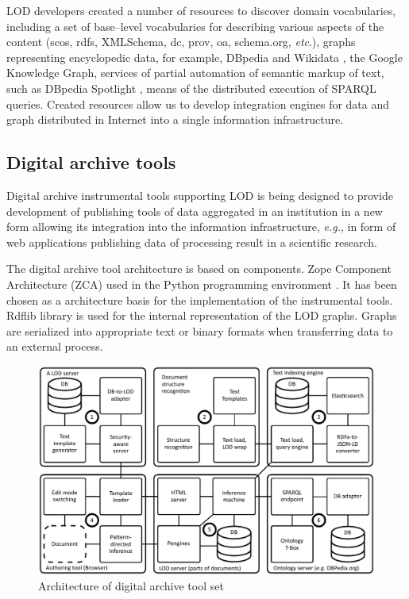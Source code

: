 \documentclass[conference,a4paper]{IEEEtran}
\begin{document}
LOD developers created a number of resources to discover domain vocabularies, including a set of base--level vocabularies for describing various aspects of the content (scos, rdfs, XMLSchema, dc, prov, oa, schema.org, \emph{etc}.), graphs representing encyclopedic data, for example, DBpedia \cite{b3} and Wikidata \cite{b4}, the Google Knowledge Graph, services of partial automation of semantic markup of text, such as DBpedia Spotlight \cite{b5}, means of the distributed execution of SPARQL queries.  Created resources allow us to develop integration engines for data and graph distributed in Internet into a single information infrastructure.

\subsection{Digital archive tools}

Digital archive instrumental tools supporting LOD is being designed to provide development of publishing tools of data aggregated in an institution in a new form allowing its integration into the information infrastructure, \emph{e.g.}, in form of web applications publishing data of processing result in a scientific research.

The digital archive tool architecture is based on components. Zope Component Architecture (ZCA) \cite{b6} used in the Python programming environment \cite{b7}.  It has been chosen as a architecture basis for the implementation of the instrumental tools.  Rdflib library is used for the internal representation of the LOD graphs.  Graphs are serialized into appropriate text or binary formats when transferring data to an external process.

\begin{figure}
  \begin{center}
  \includegraphics[width=1\linewidth]{architecture-mda-lod-ext.pdf}
  \caption{Architecture of digital archive tool set}
\end{center}
\end{figure}
\end{document}
